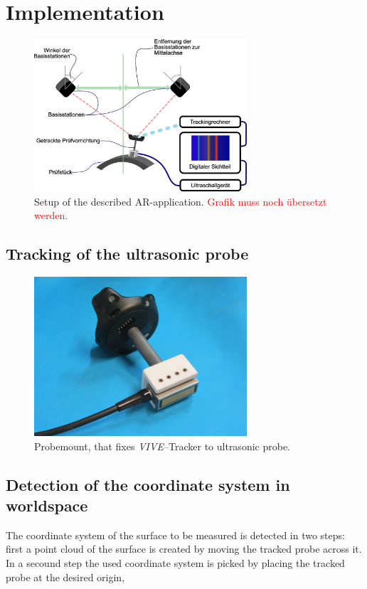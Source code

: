 \documentclass{VRARWorkshop}
\begin{document}
\section{Implementation}
\cite{dorner_virtual_2013}

\begin{figure}[h!]
    \begin{center}
        \includegraphics[width=79mm]{images/Setup.eps}
        \caption{\label{fig:Setup} Setup of the described AR-application. \textcolor{red}{Grafik muss noch übersetzt werden.}}
    \end{center}
\end{figure}

\subsection{Tracking of the ultrasonic probe}

\begin{figure}[h!]
    \begin{center}
        \includegraphics[width=79mm]{images/probemount.jpg}
        \caption{\label{fig:probemount} Probemount, that fixes \textit{VIVE--}Tracker to ultrasonic probe.}
    \end{center}
\end{figure}

\subsection{Detection of the coordinate system in worldspace}
The coordinate system of the surface to be measured is detected in two steps: first a point cloud of the surface is created by moving the tracked probe across it.
In a secound step the used coordinate system is picked by placing the tracked probe at the desired origin, 
\end{document}
